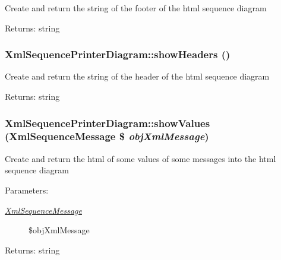 Create and return the string of the footer of the html sequence diagram

\begin{Desc}
\item[Returns:]string \end{Desc}
\hypertarget{class_xml_sequence_printer_diagram_e7975e1165f4b290bc9ddaba3ae7d5c5}{
\subsubsection[{showHeaders}]{\setlength{\rightskip}{0pt plus 5cm}XmlSequencePrinterDiagram::showHeaders ()}}
\label{class_xml_sequence_printer_diagram_e7975e1165f4b290bc9ddaba3ae7d5c5}


Create and return the string of the header of the html sequence diagram

\begin{Desc}
\item[Returns:]string \end{Desc}
\hypertarget{class_xml_sequence_printer_diagram_eda31caa1d4a613d270b3ca55accd2dd}{
\subsubsection[{showValues}]{\setlength{\rightskip}{0pt plus 5cm}XmlSequencePrinterDiagram::showValues ({\bf XmlSequenceMessage} \$ {\em objXmlMessage})}}
\label{class_xml_sequence_printer_diagram_eda31caa1d4a613d270b3ca55accd2dd}


Create and return the html of some values of some messages into the html sequence diagram

\begin{Desc}
\item[Parameters:]
\begin{description}
\item[{\em \hyperlink{class_xml_sequence_message}{XmlSequenceMessage}}]\$objXmlMessage \end{description}
\end{Desc}
\begin{Desc}
\item[Returns:]string \end{Desc}


